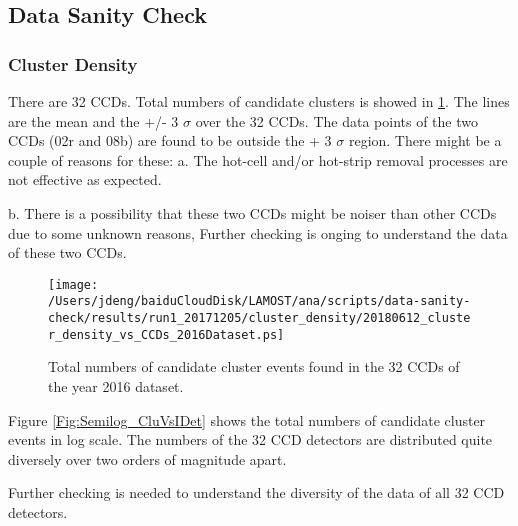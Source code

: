 \documentclass[12pt,twoside,letterpaper]{article}
\begin{document}
\subsection{Data Sanity Check} 

\subsubsection{Cluster Density} 
There are 32 CCDs. Total numbers of candidate
clusters is showed in \ref{Fig:CluVsIDet}. The lines are the
mean and the +/- 3 $\sigma$ over the 32 CCDs. The data points of the two CCDs 
(02r and 08b)
are found to be outside the + 3 $\sigma$ region. 
There might be a couple of reasons for these: 
a. The hot-cell and/or hot-strip removal processes are not effective as expected. 

b. There is a possibility that these two CCDs might be noiser than other CCDs due to some unknown reasons, 
Further checking is onging to understand the data of these two CCDs. 


   \begin{figure}[!htbp]
   \begin{center}
       \texttt{[image: /Users/jdeng/baiduCloudDisk/LAMOST/ana/scripts/data-sanity-check/results/run1\_20171205/cluster\_density/20180612\_cluster\_density\_vs\_CCDs\_2016Dataset.ps]}
       \caption{Total numbers of candidate cluster events found in the 32 CCDs of the year 2016 dataset.}  
       \label{Fig:CluVsIDet}
   \end{center}    
   \end{figure}

Figure \ref{Fig:Semilog_CluVsIDet} shows the total numbers of
candidate cluster events in log scale. The numbers of the 32 CCD detectors are distributed quite diversely over two orders of magnitude apart. 

Further checking is needed to understand the diversity of the data of all 32 CCD detectors. 
\end{document}
